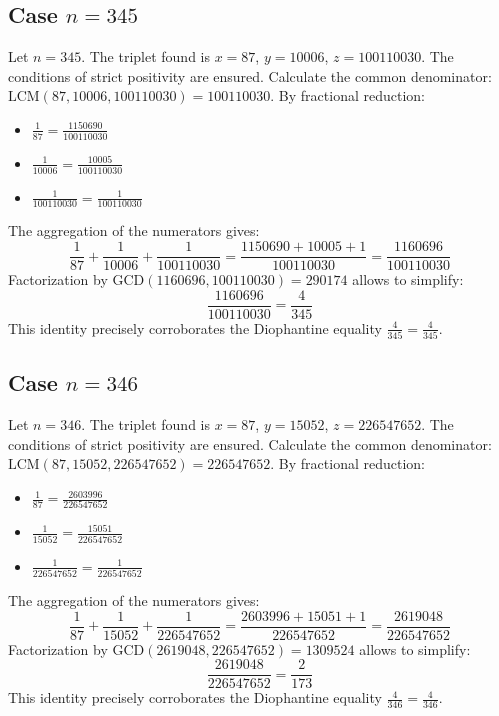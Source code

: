 \documentclass[11pt,a4paper]{article}
\begin{document}
\subsection{Case $n = 345$}
Let $n = 345$. The triplet found is $x = 87$, $y = 10006$, $z = 100110030$.
The conditions of strict positivity are ensured.
Calculate the common denominator: $\text{LCM}(87, 10006, 100110030) = 100110030$.
By fractional reduction:
\begin{itemize}
    \item $\frac{1}{87} = \frac{1150690}{100110030}$
    \item $\frac{1}{10006} = \frac{10005}{100110030}$
    \item $\frac{1}{100110030} = \frac{1}{100110030}$
\end{itemize}
The aggregation of the numerators gives:
$$ \frac{1}{87} + \frac{1}{10006} + \frac{1}{100110030} = \frac{1150690 + 10005 + 1}{100110030} = \frac{1160696}{100110030} $$
Factorization by $\text{GCD}(1160696, 100110030) = 290174$ allows to simplify:
$$ \frac{1160696}{100110030} = \frac{4}{345} $$
This identity precisely corroborates the Diophantine equality $\frac{4}{345} = \frac{4}{345}$.

\subsection{Case $n = 346$}
Let $n = 346$. The triplet found is $x = 87$, $y = 15052$, $z = 226547652$.
The conditions of strict positivity are ensured.
Calculate the common denominator: $\text{LCM}(87, 15052, 226547652) = 226547652$.
By fractional reduction:
\begin{itemize}
    \item $\frac{1}{87} = \frac{2603996}{226547652}$
    \item $\frac{1}{15052} = \frac{15051}{226547652}$
    \item $\frac{1}{226547652} = \frac{1}{226547652}$
\end{itemize}
The aggregation of the numerators gives:
$$ \frac{1}{87} + \frac{1}{15052} + \frac{1}{226547652} = \frac{2603996 + 15051 + 1}{226547652} = \frac{2619048}{226547652} $$
Factorization by $\text{GCD}(2619048, 226547652) = 1309524$ allows to simplify:
$$ \frac{2619048}{226547652} = \frac{2}{173} $$
This identity precisely corroborates the Diophantine equality $\frac{4}{346} = \frac{4}{346}$.
\end{document}
